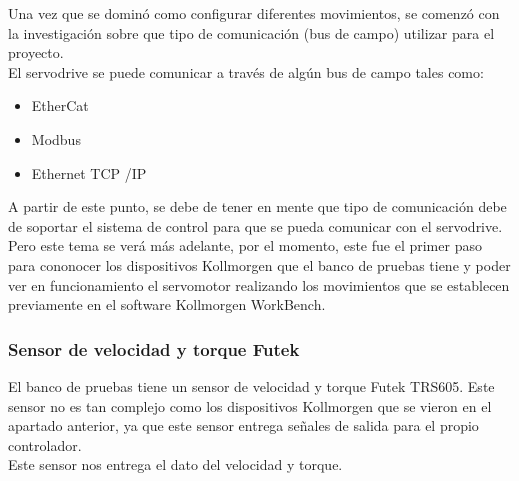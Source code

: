 \documentclass[12pt,titlepage]{article}
\begin{document}
\newpage
Una vez que se dominó como configurar diferentes movimientos, se comenzó con la investigación sobre que tipo de comunicación (bus de campo) utilizar para el proyecto. \\ 

El servodrive se puede comunicar a través de algún  bus de campo tales como: \\
\begin{itemize}
\item EtherCat 
\item Modbus 
\item Ethernet TCP /IP
\end{itemize}

A partir de este punto, se debe de tener en mente que tipo de comunicación debe de soportar el sistema de control para que se pueda comunicar con el servodrive. \\ 

Pero este tema se verá más adelante, por el momento, este fue el primer paso para cononocer los dispositivos Kollmorgen que el banco de pruebas tiene y poder ver en funcionamiento el servomotor realizando los movimientos que se establecen previamente en el software Kollmorgen WorkBench. \\ 

\subsubsection{Sensor de velocidad y torque Futek } 
El banco de pruebas tiene un sensor de velocidad y torque Futek TRS605. Este sensor no es tan complejo como los dispositivos Kollmorgen que se vieron en el apartado anterior, ya que este sensor entrega señales de salida para el propio controlador. \\

Este sensor nos entrega el dato del velocidad y torque. \\ 
\end{document}
